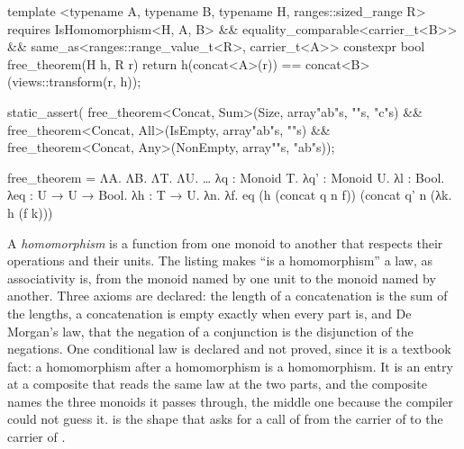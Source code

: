 \begin{listing}[tp]
\vspace{-7pt}
\begin{minipage}[t]{0.48\linewidth}
\begin{cpp}
template <typename A, typename B,
    typename H, ranges::sized_range R>
  requires IsHomomorphism<H, A, B> &&
    equality_comparable<carrier_t<B>> &&
    same_as<ranges::range_value_t<R>,
            carrier_t<A>>
constexpr bool free_theorem(H h, R r) {
  return h(concat<A>(r)) ==
      concat<B>(views::transform(r, h)); }
\end{cpp}
\end{minipage}\hspace{0.04\linewidth}%
\begin{minipage}[t]{0.48\linewidth}
\begin{cpp}
static_assert(
free_theorem<Concat, Sum>(Size{},
    array{"ab"s, ""s, "c"s}) &&
free_theorem<Concat, All>(IsEmpty{},
    array{"ab"s, ""s}) &&
free_theorem<Concat, Any>(NonEmpty{},
    array{""s, "ab"s}));
\end{cpp}
\end{minipage}
\vspace{-7pt}
\begin{sysf}
free_theorem = ΛA. ΛB. ΛT. ΛU. …
  λq : Monoid T. λq' : Monoid U. λl : Bool.
  λeq : U → U → Bool. λh : T → U. λn. λf.
    eq (h (concat q n f)) (concat q' n (λk. h (f k)))
\end{sysf}
\caption{What the compiler derives: a law derived from laws, and a theorem that comes for free.
Left: the law, a conditional law, the theorem. Right: three axioms, the derived law, three instances.}
\label{lst:theorems}
\end{listing}

A \emph{homomorphism} is a function from one monoid to another that respects their operations and their units.
The listing makes ``is a homomorphism'' a law, as associativity is, from the monoid named by one unit to the monoid named by another.
Three axioms are declared: the length of a concatenation is the sum of the lengths, a concatenation is empty exactly when every part is, and De Morgan's law, that the negation of a conjunction is the disjunction of the negations.
One conditional law is declared and not proved, since it is a textbook fact: a homomorphism after a homomorphism is a homomorphism.
It is an entry at a composite that reads the same law at the two parts, and the composite names the three monoids it passes through, the middle one because the compiler could not guess it.
 is the shape that asks for a call of  from the carrier of  to the carrier of .

